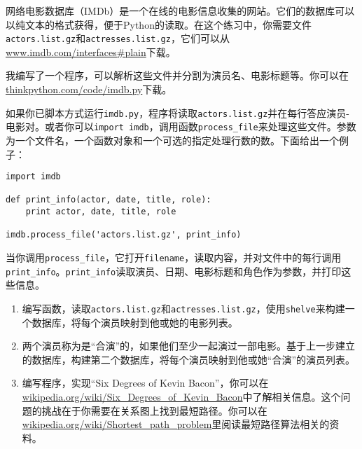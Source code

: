 \begin{ex}


网络电影数据库（IMDb）是一个在线的电影信息收集的网站。它们的数据库可以以纯文本的格式获得，便于Python的读取。在这个练习中，你需要文件{\tt actors.list.gz}和{\tt actresses.list.gz}，它们可以从\url{www.imdb.com/interfaces#plain}下载。


我编写了一个程序，可以解析这些文件并分割为演员名、电影标题等。你可以在\url{thinkpython.com/code/imdb.py}下载。

如果你已脚本方式运行{\tt imdb.py}，程序将读取{\tt actors.list.gz}并在每行答应演员-电影对。或者你可以{\tt import imdb}，调用函数\verb"process_file"来处理这些文件。参数为一个文件名，一个函数对象和一个可选的指定处理行数的数。下面给出一个例子：

\beforeverb
\begin{verbatim}
import imdb

def print_info(actor, date, title, role):
    print actor, date, title, role

imdb.process_file('actors.list.gz', print_info)
\end{verbatim}
\afterverb

当你调用\verb"process_file"，它打开{\tt filename}，读取内容，并对文件中的每行调用\verb"print_info"。\verb"print_info"读取演员、日期、电影标题和角色作为参数，并打印这些信息。

\begin{enumerate}

\item 编写函数，读取{\tt actors.list.gz}和{\tt actresses.list.gz}，使用{\tt shelve}来构建一个数据库，将每个演员映射到他或她的电影列表。


\item 两个演员称为是“合演”的，如果他们至少一起演过一部电影。基于上一步建立的数据库，构建第二个数据库，将每个演员映射到他或她“合演”的演员列表。


 \item 编写程序，实现“Six Degrees of Kevin Bacon”，你可以在\url{wikipedia.org/wiki/Six_Degrees_of_Kevin_Bacon}中了解相关信息。这个问题的挑战在于你需要在关系图上找到最短路径。你可以在\url{wikipedia.org/wiki/Shortest_path_problem}里阅读最短路径算法相关的资料。

\end{enumerate}

\end{ex}
